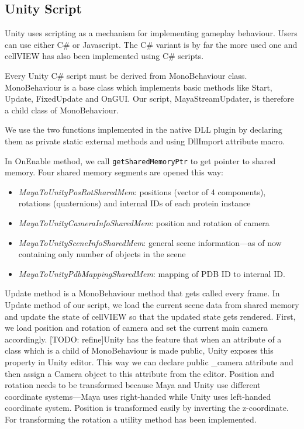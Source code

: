 \documentclass[
  digital, %
  table,   %
  nolof,     %
  nolot,     %
  oneside,
]{fithesis3}
\begin{document}
\subsection{Unity Script}
Unity uses scripting as a mechanism for implementing gameplay behaviour. Users can use either C\# or Javascript. The C\# variant is by far the more used one and cellVIEW has also been implemented using C\# scripts.

Every Unity C\# script must be derived from MonoBehaviour class. MonoBehaviour is a base class which implements basic methods like Start, Update, FixedUpdate and OnGUI. Our script, MayaStreamUpdater, is therefore a child class of MonoBehaviour.

We use the two functions implemented in the native DLL plugin by declaring them as private static external methods and using DllImport attribute macro.

In OnEnable method, we call \texttt{getSharedMemoryPtr} to get pointer to shared memory. Four shared memory segments are opened this way:
\begin{itemize}
\item \textit{MayaToUnityPosRotSharedMem}: positions (vector of 4 components), rotations (quaternions) and internal IDs of each protein instance
\item \textit{MayaToUnityCameraInfoSharedMem}: position and rotation of camera
\item \textit{MayaToUnitySceneInfoSharedMem}: general scene information—as of now containing only number of objects in the scene
\item \textit{MayaToUnityPdbMappingSharedMem}: mapping of PDB ID to internal ID.
\end{itemize}

Update method is a MonoBehaviour method that gets called every frame. In Update method of our script, we load the current scene data from shared memory and update the state of cellVIEW so that the updated state gets rendered. First, we load position and rotation of camera and set the current main camera accordingly. [TODO: refine]Unity has the feature that when an attribute of a class which is a child of MonoBehaviour is made public, Unity exposes this property in Unity editor. This way we can declare public \_camera attribute and then assign a Camera object to this attribute from the editor. Position and rotation needs to be transformed because Maya and Unity use different coordinate systems—Maya uses right-handed while Unity uses left-handed coordinate system. Position is transformed easily by inverting the z-coordinate. For transforming the rotation a utility method has been implemented.
\end{document}
